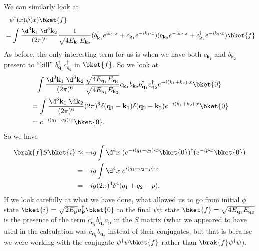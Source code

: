\documentclass[a4paper]{article}
\begin{document}
We can similarly look at
\begin{align*}
  &\hphantom{=}\psi^\dagger (x) \psi(x) \bket{f} \\
  &= \int \frac{\d^3 \mathbf{k}_1\;\d^3 \mathbf{k}_2}{(2\pi)^6} \frac{1}{\sqrt{4E_{\mathbf{k}_1} E_{\mathbf{k}_2}}}(b^\dagger_{\mathbf{k}_1} e^{ik_1\cdot x} + c_{\mathbf{k}_1} e^{-ik_1\cdot x})(b_{\mathbf{k}_2} e^{-ik_2 \cdot x} + c_{\mathbf{k}_2}^\dagger e^{-i k_2 \cdot x})\bket{f}
\end{align*}
As before, the only interesting term for us is when we have both $c_{\mathbf{k}_1}$ and $b_{\mathbf{k}_2}$ present to ``kill'' $b_{\mathbf{q}_1}^\dagger c_{\mathbf{q}_2}^\dagger$ in $\bket{f}$. So we look at
\begin{align*}
  &\hphantom{=} \int \frac{\d^3 \mathbf{k}_1 \; \d^3 \mathbf{k}_2}{(2\pi)^6} \frac{\sqrt{4E_{\mathbf{q}_1}E_{\mathbf{q}_2}}}{\sqrt{4 E_{\mathbf{k}_1} E_{\mathbf{k}_2}}} c_{\mathbf{k}_1} b_{\mathbf{k}_2}b_{\mathbf{q}_1}^\dagger c_{\mathbf{q}_2}^\dagger e^{-i(k_1 + k_2) \cdot x}\bket{0}\\
  &= \int \frac{\d^3 \mathbf{k}_1 \;\d \mathbf{k}_2}{(2\pi)^6} (2\pi)^6 \delta(\mathbf{q}_1 - \mathbf{k}_1)\delta(\mathbf{q}_2 - \mathbf{k}_2) e^{-i(k_1 + k_2)\cdot x}\bket{0}\\
  &= e^{-i(q_1 + q_2)\cdot x}\bket{0}.
\end{align*}
So we have
\begin{align*}
  \brak{f}S\bket{i} &\approx -ig \int \d^4 x\; (e^{-i(q_1 + q_2) \cdot x}\bket{0})^\dagger (e^{-ip\cdot x}\bket{0})\\
  &= -ig \int \d^4 x\; e^{i(q_1 + q_2 - p) \cdot x}\\
  &= -ig (2\pi)^4 \delta^4(q_1 + q_2 - p).
\end{align*}
If we look carefully at what we have done, what allowed us to go from initial $\phi$ state $\bket{i} = \sqrt{2 E_\mathbf{p}} a_\mathbf{p}^\dagger\bket{0}$ to the final $\psi\bar\psi$ state $\bket{f} = \sqrt{4 E_{\mathbf{q}_1} E_{\mathbf{q}_2}}$ is the presence of the term $c_{\mathbf{q}_1}^\dagger b_{\mathbf{q}_2}^\dagger a_\mathbf{p}$ in the $S$ matrix (what we appeared to have used in the calculation was $c_{\mathbf{q}_1} b_{\mathbf{q}_2}$ instead of their conjugates, but that is because we were working with the conjugate $\psi^\dagger \psi \bket{f}$ rather than $\brak{f} \psi^\dagger \psi$).
\end{document}
